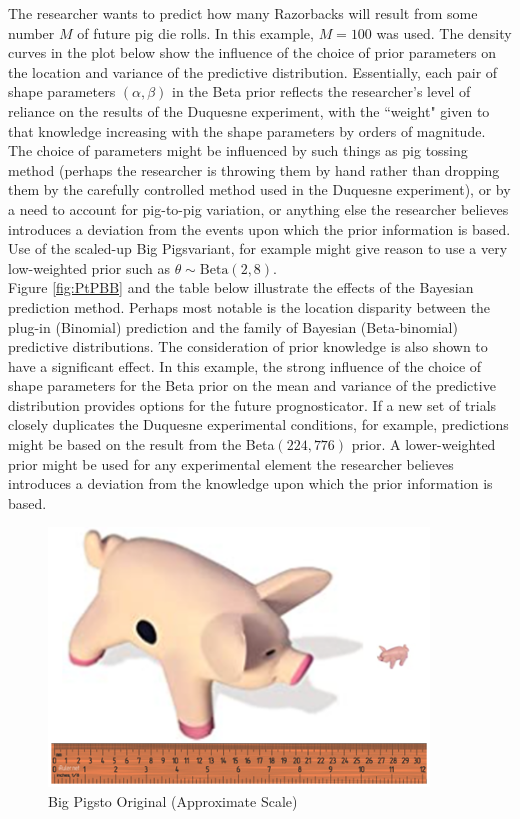 \documentclass[12pt, a4paper]{article}
\begin{document}
\noindent The researcher wants to predict how many Razorbacks will result from some number $M$ of future pig die rolls.  In this example, $M=100$ was used.  The density curves in the plot below show the influence of the choice of prior parameters on the location and variance of the predictive distribution.  Essentially, each pair of shape parameters $(\alpha,\beta)$ in the Beta prior reflects the researcher's level of reliance on the results of the Duquesne experiment, with the ``weight" given to that knowledge increasing with the shape parameters by orders of magnitude.  The choice of parameters might be influenced by such things as pig tossing method (perhaps the researcher is throwing them by hand rather than dropping them by the carefully controlled method used in the Duquesne experiment), or by a need to account for pig-to-pig variation, or anything else the researcher believes introduces a deviation from the events upon which the prior information is based.  Use of the scaled-up Big Pigs\texttrademark  variant, for example might give reason to use a very low-weighted prior such as $\theta\sim\text{Beta}(2,8)$.\\

\noindent Figure \ref{fig:PtPBB} and the table below illustrate the effects of the Bayesian prediction method. Perhaps most notable is the location disparity between the plug-in (Binomial) prediction and the family of Bayesian (Beta-binomial) predictive distributions.  The consideration of prior knowledge is also shown to have a significant effect.  In this example, the strong influence of the choice of shape parameters for the Beta prior on the mean and variance of the predictive distribution provides options for the future prognosticator. If a new set of trials closely duplicates the Duquesne experimental conditions, for example, predictions might be based on the result from the Beta$(224,776)$ prior.  A lower-weighted prior might be used for any experimental element the researcher believes introduces a deviation from the knowledge upon which the prior information is based.

\begin{figure}[h]
  \centering
  \includegraphics[width=0.9\textwidth]{./Graphics/PassThePigs/PigSize_wRuler}
  \caption{Big Pigs\texttrademark to Original (Approximate Scale)}
\end{figure}
\end{document}
